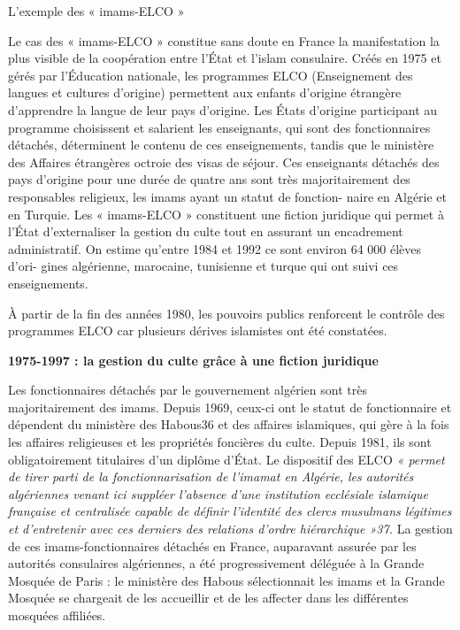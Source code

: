 L'exemple des « imams-ELCO »


Le cas des « imams-ELCO » constitue sans doute en France la
manifestation la plus visible de la coopération entre l'État et l'islam
consulaire. Créés en 1975 et gérés par l'Éducation nationale, les
programmes ELCO (Enseignement des langues et cultures d'origine)
permettent aux enfants d'origine étrangère d'apprendre la langue de leur
pays d'origine. Les États d'origine participant au programme choisissent
et salarient les enseignants, qui sont des fonctionnaires détachés,
déterminent le contenu de ces enseignements, tandis que le ministère des
Affaires étrangères octroie des visas de séjour. Ces enseignants
détachés des pays d'origine pour une durée de quatre ans sont très
majoritairement des responsables religieux, les imams ayant un statut de
fonction- naire en Algérie et en Turquie. Les « imams-ELCO » constituent
une fiction juridique qui permet à l'État d'externaliser la gestion du
culte tout en assurant un encadrement administratif. On estime qu'entre
1984 et 1992 ce sont environ 64 000 élèves d'ori- gines algérienne,
marocaine, tunisienne et turque qui ont suivi ces enseignements.

À partir de la fin des années 1980, les pouvoirs publics renforcent le
contrôle des programmes ELCO car plusieurs dérives islamistes ont été
constatées.

\textbf{1975-1997 : la gestion du culte grâce à une fiction juridique}

Les fonctionnaires détachés par le gouvernement algérien sont très
majoritairement des imams. Depuis 1969, ceux-ci ont le statut de
fonctionnaire et dépendent du ministère des Habous36 et des affaires
islamiques, qui gère à la fois les affaires religieuses et les
propriétés foncières du culte. Depuis 1981, ils sont obligatoirement
titulaires d'un diplôme d'État. Le dispositif des ELCO \emph{« permet de
tirer parti de la fonctionnarisation de l'imamat en Algérie, les
autorités algériennes venant ici suppléer l'absence d'une institution
ecclésiale islamique française et centralisée capable de définir
l'identité des clercs musulmans légitimes et d'entretenir avec ces
derniers des relations d'ordre hiérarchique »37.} La gestion de ces
imams-fonctionnaires détachés en France, auparavant assurée par les
autorités consulaires algériennes, a été progressivement déléguée à la
Grande Mosquée de Paris : le ministère des Habous sélectionnait les
imams et la Grande Mosquée se chargeait de les accueillir et de les
affecter dans les différentes mosquées affiliées.
 




